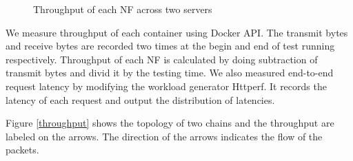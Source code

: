 \begin{figure}[!t]
\centering
{}
\hfil
{}
\hfil
\caption{Throughput of each NF across two servers}
\label{inter_throughput}
\end{figure}



We measure throughput of each container using Docker API.
The transmit bytes and receive bytes are recorded two times
at the begin and end of test running respectively.
Throughput of each NF is calculated
by doing subtraction of transmit bytes and divid it by the testing time.
We also measured end-to-end request latency by modifying the workload generator Httperf.
It records the latency of each request and output the distribution of latencies.

Figure \ref{throughput} shows the topology of two chains
and the throughput are labeled on the arrows.
The direction of the arrows indicates the flow of the packets.






